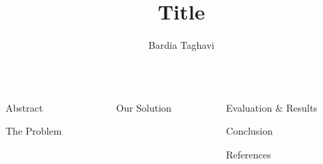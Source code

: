 \documentclass[final]{beamer}
\title{Title}
\author{Bardia Taghavi}
\institute[shortinst]{Florida Atlantic University}
\begin{document}
\begin{frame}[t]
\begin{columns}[t]
\separatorcolumn

\begin{column}{\colwidth}
  \begin{block}{Abstract}

  \end{block}

  \begin{block}{The Problem}
    
  \end{block}
\end{column}

\separatorcolumn

\begin{column}{\colwidth}
  \begin{block}{Our Solution}
    
  \end{block}
\end{column}

\separatorcolumn

\begin{column}{\colwidth}
  \begin{block}{Evaluation \& Results}

  \end{block}

  \begin{block}{Conclusion}

  \end{block}

\begin{block}{References}
  \nocite{*}
  \footnotesize{}
\end{block}

\end{column}

\separatorcolumn

\end{columns}
\end{frame}
\end{document}
